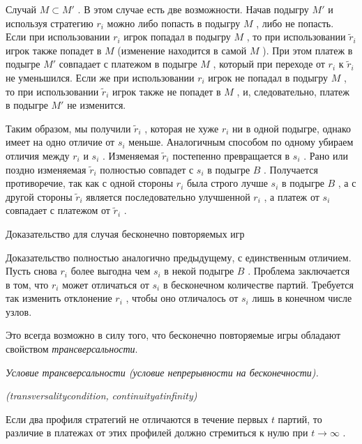 \documentclass[pdftex,12pt,a4paper]{article}
\begin{document}
Случай  $M\subset M'$ . В этом случае есть две возможности. Начав подыгру  $M'$  и используя стратегию  $r_{i} $  можно либо попасть в подыгру  $M$ , либо не попасть. Если при использовании  $r_{i} $  игрок попадал в подыгру  $M$ , то при использовании  $\tilde{r}_{i} $  игрок также попадет в  $M$  (изменение находится в самой  $M$ ). При этом платеж в подыгре  $M'$  совпадает с платежом в подыгре  $M$ , который при переходе от  $r_{i} $  к  $\tilde{r}_{i} $  не уменьшился. Если же при использовании  $r_{i} $  игрок не попадал в подыгру  $M$ , то при использовании  $\tilde{r}_{i} $  игрок также не попадет в  $M$ , и, следовательно, платеж в подыгре  $M'$  не изменится.



Таким образом, мы получили  $\tilde{r}_{i} $ , которая не хуже  $r_{i} $  ни в одной подыгре, однако имеет на одно отличие от  $s_{i} $  меньше. Аналогичным способом по одному убираем отличия между  $r_{i} $  и  $s_{i} $ . Изменяемая  $\tilde{r}_{i} $  постепенно превращается в  $s_{i} $ . Рано или поздно изменяемая  $\tilde{r}_{i} $  полностью совпадет с  $s_{i} $  в подыгре  $B$ . Получается противоречие, так как с одной стороны  $r_{i} $  была строго лучше  $s_{i} $  в подыгре  $B$ , а с другой стороны  $\tilde{r}_{i} $  является последовательно улучшенной  $r_{i} $ , а платеж от  $s_{i} $  совпадает с платежом от  $\tilde{r}_{i} $ .



Доказательство для случая бесконечно повторяемых игр

Доказательство полностью аналогично предыдущему, с единственным отличием. Пусть снова  $r_{i} $  более выгодна чем  $s_{i} $  в некой подыгре  $B$ . Проблема заключается в том, что  $r_{i} $  может отличаться от  $s_{i} $  в бесконечном количестве партий. Требуется так изменить отклонение  $r_{i} $ , чтобы оно отличалось от  $s_{i} $  лишь в конечном числе узлов.

Это всегда возможно в силу того, что бесконечно повторяемые игры обладают свойством {\it трансверсальности}.

{\it Условие трансверсальности (условие непрерывности на бесконечности).}

{\it (}{\it transversality}{\it  }{\it condition}{\it , }{\it continuity}{\it  }{\it at}{\it  }{\it infinity}{\it )}

Если два профиля стратегий не отличаются в течение первых  $t$  партий, то различие в платежах от этих профилей должно стремиться к нулю при  $t\to \infty $ .
\end{document}
